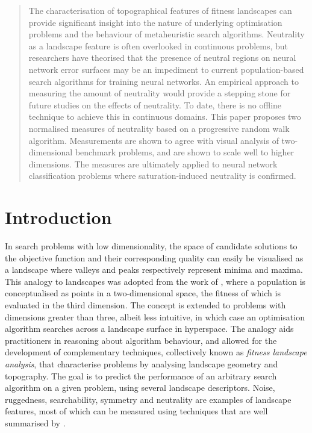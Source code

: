 \documentclass[conference]{IEEEtran}
\begin{document}
\begin{abstract}
The characterisation of topographical features of fitness landscapes can provide significant insight into the nature of underlying optimisation problems and the behaviour of metaheuristic search algorithms. Neutrality as a landscape feature is often overlooked in continuous problems, but researchers have theorised that the presence of neutral regions on neural network error surfaces may be an impediment to current population-based search algorithms for training neural networks. An empirical approach to measuring the amount of neutrality would provide a stepping stone for future studies on the effects of neutrality. To date, there is no offline technique to achieve this in continuous domains. This paper proposes two normalised measures of neutrality based on a progressive random walk algorithm. Measurements are shown to agree with visual analysis of two-dimensional benchmark problems, and are shown to scale well to higher dimensions. The measures are ultimately applied to neural network classification problems where saturation-induced neutrality is confirmed.
\end{abstract}

\section{Introduction}
\label{intro}
In search problems with low dimensionality, the space of candidate solutions to the objective function and their corresponding quality can easily be visualised as a landscape where valleys and peaks respectively represent minima and maxima. This analogy to landscapes was adopted from the work of \citet{wright1932roles}, where a population is conceptualised as points in a two-dimensional space, the fitness of which is evaluated in the third dimension. The concept is extended to problems with dimensions greater than three, albeit less intuitive, in which case an optimisation algorithm searches across a landscape surface in hyperspace. The analogy aids practitioners in reasoning about algorithm behaviour, and allowed for the development of complementary techniques, collectively known as \textit{fitness landscape analysis}, that characterise problems by analysing landscape geometry and topography. The goal is to predict the performance of an arbitrary search algorithm on a given problem, using several landscape descriptors. Noise, ruggedness, searchability, symmetry and neutrality are examples of landscape features, most of which can be measured using techniques that are well summarised by \citet{malan2013survey}. 
\end{document}
